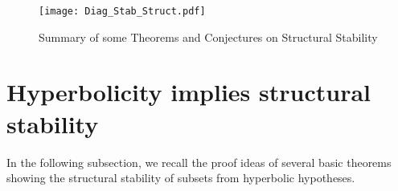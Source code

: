 \documentclass[11pt,openany,leqno]{article}
\begin{document}
\begin{figure}[h!]
	\centering
		\texttt{[image: Diag\_Stab\_Struct.pdf]}
	\caption{Summary of some Theorems and Conjectures on Structural Stability}
\end{figure}



\section{Hyperbolicity implies structural stability}\label{hypimpliesstab}

In the following subsection, we recall the proof ideas of several basic theorems showing the structural stability of subsets from hyperbolic hypotheses. %
\end{document}
